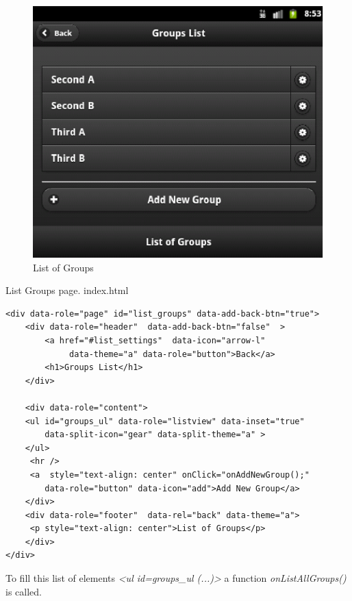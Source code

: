 \begin{figure}
    \begin{center}
        \includegraphics{eduxes_groups_list.eps}
        \caption{List of Groups}
        \label{fig:EduXesGroups}
    \end{center}
\end{figure}



\begin{bclogo}[couleur=blue!30,arrondi=0.1,ombre=true ] 
{List Groups page. index.html}
\begin{verbatim}
<div data-role="page" id="list_groups" data-add-back-btn="true">
    <div data-role="header"  data-add-back-btn="false"  >
        <a href="#list_settings"  data-icon="arrow-l"
             data-theme="a" data-role="button">Back</a>
        <h1>Groups List</h1>
    </div>                
    
    <div data-role="content">
    <ul id="groups_ul" data-role="listview" data-inset="true"  
        data-split-icon="gear" data-split-theme="a" >
    </ul>
     <hr />
     <a  style="text-align: center" onClick="onAddNewGroup();" 
        data-role="button" data-icon="add">Add New Group</a>
    </div>
    <div data-role="footer"  data-rel="back" data-theme="a">
     <p style="text-align: center">List of Groups</p>
    </div>
</div>
\end{verbatim}
\end{bclogo}
To fill this list of elements \emph{<ul id=groups\_ul (...)>} a function \emph{onListAllGroups()} is called. 

